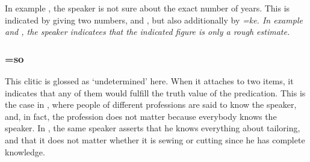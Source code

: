 In   example , the speaker is not sure about the exact number of years. This is indicated by giving two numbers,  and , but also additionally by \em =ke\em. In example  and , the speaker indicatees that the indicated figure is only a rough estimate.

\subsubsection{=so}\label{sec:morph:=so}
This clitic is glossed as `undetermined' here. When it attaches to two items, it indicates that any of them would fulfill the truth value of the predication. This is the case in , where people of different professions are said to know the speaker, and, in fact, the profession does not matter because everybody knows the speaker. In , the same speaker asserts that he knows everything about tailoring, and that it does not matter whether it is sewing or cutting since he has complete knowledge.


\\

\\ 


